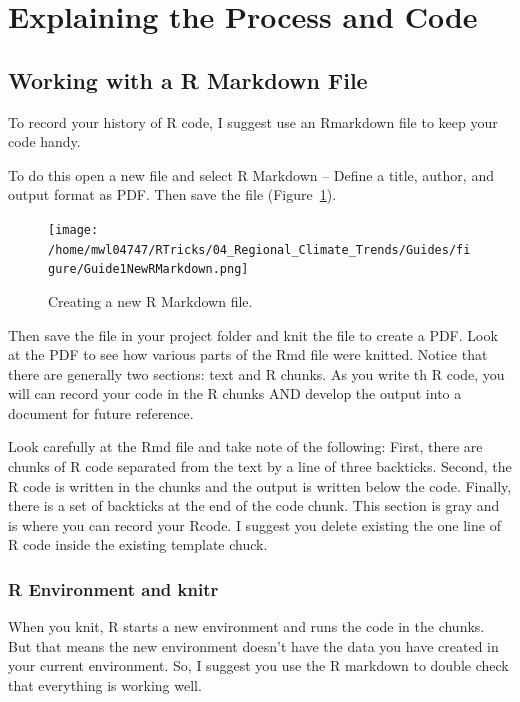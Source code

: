 \documentclass{article}\usepackage[]{graphicx}\usepackage[dvipsnames]{xcolor}
\begin{document}
\section{Explaining the Process and Code}

\subsection{Working with a R Markdown File}\label{subsec:RMarkdown}

To record your history of R code, I suggest use an Rmarkdown file to keep your code handy. 

To do this open a new file and select R Markdown -- Define a title, author, and output format as PDF. Then save the file (Figure~\ref{fig:RMarkdown}). 

\begin{figure}[h]
\centering
\texttt{[image: /home/mwl04747/RTricks/04\_Regional\_Climate\_Trends/Guides/figure/Guide1NewRMarkdown.png]}
\caption{Creating a new R Markdown file.}
\label{fig:RMarkdown}
\end{figure}


Then save the file in your project folder and knit the file to create a PDF. Look at the PDF to see how various parts of the Rmd file were knitted. Notice that there are generally two sections: text and R chunks. As you write th R code, you will can record your code in the R chunks AND develop the output into a document for future reference.

Look carefully at the Rmd file and take note of the following: First, there are chunks of R code separated from the text by a line of three backticks. Second, the R code is written in the chunks and the output is written below the code. Finally, there is a set of backticks at the end of the code chunk. This section is gray and is where you can record your Rcode. I suggest you delete existing the one line of R code inside the existing template chuck.  

\subsubsection{R Environment and knitr}

When you knit, R starts a new environment and runs the code in the chunks. But that means the new environment doesn't have the data you have created in your current environment. So, I suggest you use the R markdown to double check that everything is working well. 
\end{document}
